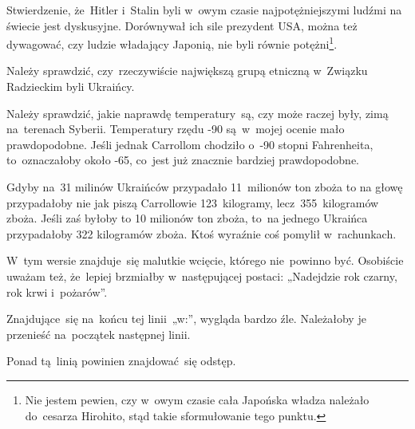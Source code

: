 \documentclass[a4paper,11pt]{article}
\begin{document}
\noindent
{} Stwierdzenie, że~Hitler i~Stalin byli w~owym czasie
najpotężniejszymi ludźmi na świecie jest dyskusyjne. Dorównywał ich
sile prezydent USA, można też dywagować, czy ludzie władający Japonią,
nie byli równie potężni\footnote{Nie jestem pewien, czy w~owym czasie
  cała Japońska władza należało do~cesarza Hirohito, stąd takie
  sformułowanie tego punktu.}.

\VerSpaceFour





\noindent
{} Należy sprawdzić, czy~rzeczywiście największą grupą etniczną
w~Związku Radzieckim byli Ukraińcy.

\VerSpaceFour





\noindent
{} Należy sprawdzić, jakie naprawdę temperatury~są, czy może raczej
były, zimą na~terenach Syberii. Temperatury rzędu -90\textcelsius
są~w~mojej ocenie mało prawdopodobne. Jeśli jednak Carrollom chodziło
o~-90 stopni Fahrenheita, to~oznaczałoby około -65\textcelsius, co~jest
już znacznie bardziej prawdopodobne.

\VerSpaceFour





\noindent
{} Gdyby na~31 milinów Ukraińców przypadało 11~milionów ton
zboża to na głowę przypadałoby nie jak piszą Carrollowie
123~kilogramy, lecz~355~kilogramów zboża. Jeśli zaś byłoby to 10
milionów ton zboża, to~na jednego Ukraińca przypadałoby 322 kilogramów
zboża. Ktoś wyraźnie coś pomylił w~rachunkach.

\VerSpaceFour





\noindent
{} W~tym wersie znajduje~się malutkie wcięcie, którego
nie~powinno być. Osobiście uważam też, że~lepiej brzmiałby w~następującej
postaci: „Nadejdzie rok czarny, rok krwi i~pożarów”.

\VerSpaceFour





\noindent
{} Znajdujące~się na~końcu tej linii~„w:”, wygląda bardzo
źle. Należałoby je przenieść na~początek następnej linii.

\VerSpaceFour





\noindent
{} Ponad tą~linią powinien znajdować~się odstęp.
\end{document}
